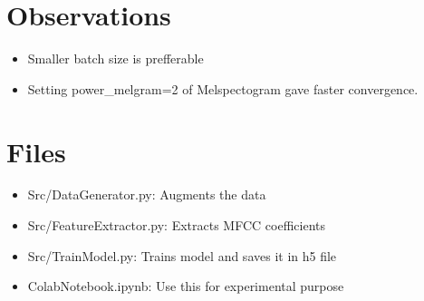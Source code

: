 \documentclass[11pt,english]{article}
\begin{document}
 
\section{Observations}
\begin{itemize}
    \item Smaller batch size is prefferable
    \item Setting power\_melgram=2 of Melspectogram gave faster convergence.
\end{itemize}
\section{Files}
\begin{itemize}
    \item Src/DataGenerator.py: Augments the data
    \item Src/FeatureExtractor.py: Extracts MFCC coefficients
    \item Src/TrainModel.py: Trains model and saves it in h5 file
    \item ColabNotebook.ipynb: Use this for experimental purpose
\end{itemize}
\end{document}
